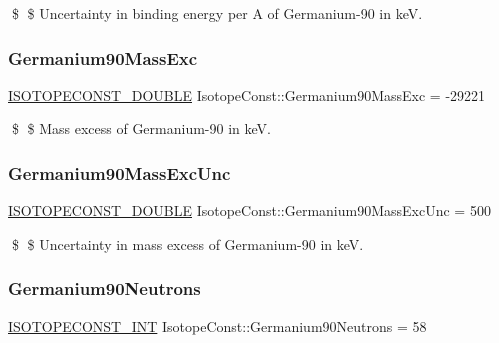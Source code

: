 \$ \$ Uncertainty in binding energy per A of Germanium-\/90 in keV. \mbox{\label{group___isotope_const-_germanium-_ge90_ga2962354c662b5932cd9478e92deb7401}} 
\subsubsection{\texorpdfstring{Germanium90\+Mass\+Exc}{Germanium90MassExc}}
{\footnotesize\ttfamily \mbox{\hyperlink{group___isotope_const-_macros_ga8f45a7272ce02c0b4c65c44636ed719a}{I\+S\+O\+T\+O\+P\+E\+C\+O\+N\+S\+T\+\_\+\+D\+O\+U\+B\+LE}} Isotope\+Const\+::\+Germanium90\+Mass\+Exc = -\/29221}

\$ \$ Mass excess of Germanium-\/90 in keV. \mbox{\label{group___isotope_const-_germanium-_ge90_gaaf7ddcd974afec8a140654b357a761a6}} 
\subsubsection{\texorpdfstring{Germanium90\+Mass\+Exc\+Unc}{Germanium90MassExcUnc}}
{\footnotesize\ttfamily \mbox{\hyperlink{group___isotope_const-_macros_ga8f45a7272ce02c0b4c65c44636ed719a}{I\+S\+O\+T\+O\+P\+E\+C\+O\+N\+S\+T\+\_\+\+D\+O\+U\+B\+LE}} Isotope\+Const\+::\+Germanium90\+Mass\+Exc\+Unc = 500}

\$ \$ Uncertainty in mass excess of Germanium-\/90 in keV. \mbox{\label{group___isotope_const-_germanium-_ge90_gae428ba4c23c5a685429de75bba9a40f4}} 
\subsubsection{\texorpdfstring{Germanium90\+Neutrons}{Germanium90Neutrons}}
{\footnotesize\ttfamily \mbox{\hyperlink{group___isotope_const-_macros_ga5f18360b3e99483a35c32d789e62621c}{I\+S\+O\+T\+O\+P\+E\+C\+O\+N\+S\+T\+\_\+\+I\+NT}} Isotope\+Const\+::\+Germanium90\+Neutrons = 58}


